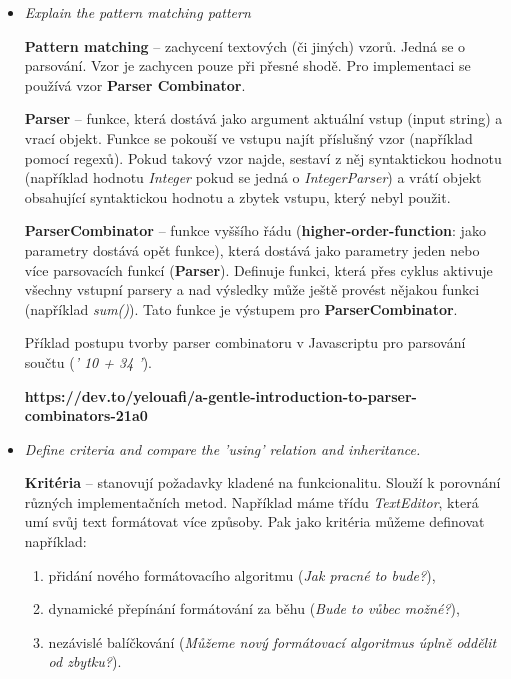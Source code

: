 \documentclass{szzclass}
\begin{document}
\begin{itemize}
      \item \textit{Explain the pattern matching pattern}

      \textbf{Pattern matching} -- zachycení textových (či jiných) vzorů. Jedná se o parsování. Vzor je
      zachycen pouze při přesné shodě. Pro implementaci se používá vzor \textbf{Parser Combinator}.

      \textbf{Parser} -- funkce, která dostává jako argument aktuální vstup (input string) a vrací objekt.
      Funkce se pokouší ve vstupu najít příslušný vzor (například pomocí regexů). Pokud takový vzor najde,
      sestaví z něj syntaktickou hodnotu (například hodnotu \textit{Integer} pokud se jedná o \textit{IntegerParser})
      a vrátí objekt obsahující syntaktickou hodnotu a zbytek vstupu, který nebyl použit.

      \textbf{ParserCombinator} -- funkce vyššího řádu (\textbf{higher-order-function}: jako parametry dostává opět
      funkce), která dostává jako parametry jeden nebo více parsovacích funkcí (\textbf{Parser}).
      Definuje funkci, která přes cyklus aktivuje všechny vstupní parsery a nad výsledky může
      ještě provést nějakou funkci (například \textit{sum()}). Tato funkce je výstupem pro
      \textbf{ParserCombinator}.

      Příklad postupu tvorby parser combinatoru v Javascriptu pro parsování součtu (\textit{' 10 + 34  '}).

      \textbf{https://dev.to/yelouafi/a-gentle-introduction-to-parser-combinators-21a0}


      \item \textit{Define criteria and compare the 'using' relation and inheritance.}

      \textbf{Kritéria} -- stanovují požadavky kladené na funkcionalitu. Slouží k porovnání různých
      implementačních metod. Například máme třídu \textit{TextEditor}, která umí svůj text
      formátovat více způsoby. Pak jako kritéria můžeme definovat například:

      \begin{enumerate}
            \item přidání nového formátovacího algoritmu (\textit{Jak pracné to bude?}),
            \item dynamické přepínání formátování za běhu (\textit{Bude to vůbec možné?}),
            \item nezávislé balíčkování (\textit{Můžeme nový formátovací algoritmus úplně oddělit od zbytku?}).
      \end{enumerate}


\end{itemize}
\end{document}
